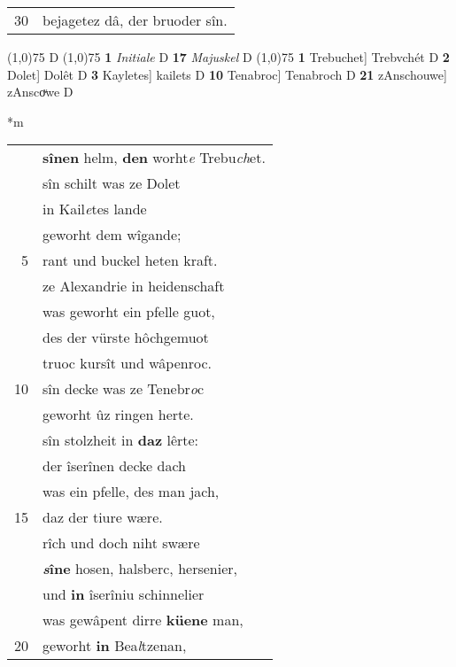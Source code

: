 \documentclass[8pt,a4paper,notitlepage]{article}
\begin{document}
\begin{table}[ht]
\begin{minipage}[t]{0.5\linewidth}
\begin{tabular}{rl}
30 & bejagetez dâ, der bruoder sîn.\\ 
\end{tabular}
\scriptsize
\line(1,0){75} \newline
D \newline
\line(1,0){75} \newline
\textbf{1} \textit{Initiale} D  \textbf{17} \textit{Majuskel} D  \newline
\line(1,0){75} \newline
\textbf{1} Trebuchet] Trebvchét D \textbf{2} Dolet] Dolêt D \textbf{3} Kayletes] kailets D \textbf{10} Tenabroc] Tenabroch D \textbf{21} zAnschouwe] zAnscoͮwe D \newline
\end{minipage}
\hspace{0.5cm}
\begin{minipage}[t]{0.5\linewidth}
\small
\begin{center}*m
\end{center}
\begin{tabular}{rl}
 & \textbf{sînen} helm, \textbf{den} worht\textit{e} Trebu\textit{ch}et.\\ 
 & sîn schilt was ze Dolet\\ 
 & in Kail\textit{e}tes lande\\ 
 & geworht dem wîgande;\\ 
5 & rant und buckel heten kraft.\\ 
 & ze Alexandrie in heidenschaft\\ 
 & was geworht ein pfelle guot,\\ 
 & des der vürste hôchgemuot\\ 
 & truoc kursît und wâpenroc.\\ 
10 & sîn decke was ze Tenebr\textit{o}c\\ 
 & geworht ûz ringen herte.\\ 
 & sîn stolzheit in \textbf{daz} lêrte:\\ 
 & der îserînen decke dach\\ 
 & was ein pfelle, des man jach,\\ 
15 & daz der tiure wære.\\ 
 & rîch und doch niht swære\\ 
 & \textbf{\textit{s}îne} hosen, halsberc, hersenier,\\ 
 & und \textbf{in} îserîniu schinnelier\\ 
 & was gewâpent dirre \textbf{küene} man,\\ 
20 & geworht \textbf{in} Bea\textit{l}tzenan,\\ 

\end{tabular}
\end{minipage}
\end{table}
\end{document}
